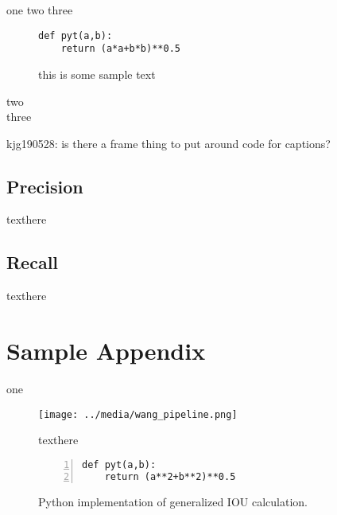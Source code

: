 one two three \\

\begin{figure}[ht]
\begin{lstlisting}
def pyt(a,b):
    return (a*a+b*b)**0.5
\end{lstlisting}
\onehalfspacing %
\caption{this is some sample text}
\label{code2}
\end{figure}

two\\
three


kjg190528: is there a frame thing to put around code for captions?

\subsection{Precision}
texthere



\subsection{Recall}
texthere

\section{Sample Appendix}
one

\begin{figure}[ht] %
    \texttt{[image: ../media/wang\_pipeline.png]}
    \caption{texthere}
    \label{delme_figure} %
\end{figure}


\begin{figure}[ht]
\begin{lstlisting}[numbers=left]
def pyt(a,b):
    return (a**2+b**2)**0.5
\end{lstlisting}
\onehalfspacing %
\caption{Python implementation of generalized IOU calculation.}
\label{delme_code} %
\end{figure}
